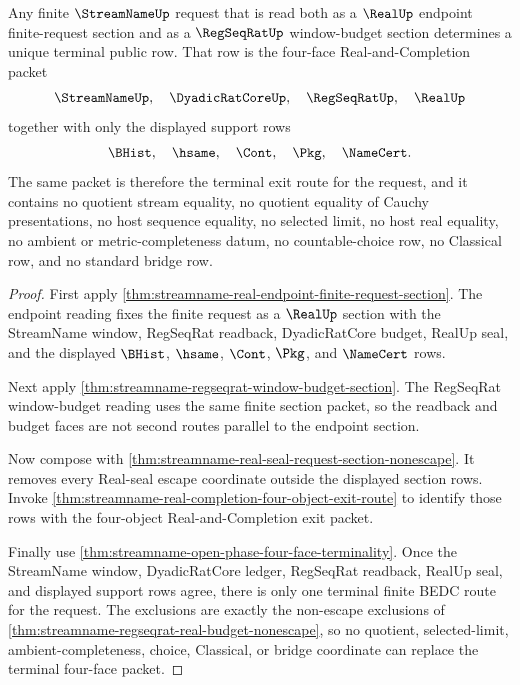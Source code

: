 \begin{theorem}
\label{thm:streamname-finite-request-terminal-coherence}
Any finite $\StreamNameUp$ request that is read both as a $\RealUp$ endpoint
finite-request section and as a $\RegSeqRatUp$ window-budget section
determines a unique terminal public row. That row is the four-face
Real-and-Completion packet
$$
\StreamNameUp,\quad \DyadicRatCoreUp,\quad \RegSeqRatUp,\quad \RealUp
$$
together with only the displayed support rows
$$
\BHist,\quad \hsame,\quad \Cont,\quad \Pkg,\quad \NameCert.
$$
The same packet is therefore the terminal exit route for the request, and it
contains no quotient stream equality, no quotient equality of Cauchy
presentations, no host sequence equality, no selected limit, no host real
equality, no ambient or metric-completeness datum, no countable-choice row, no
Classical row, and no standard bridge row.
\end{theorem}
\begin{proof}
First apply
\autoref{thm:streamname-real-endpoint-finite-request-section}. The endpoint
reading fixes the finite request as a $\RealUp$ section with the StreamName
window, RegSeqRat readback, DyadicRatCore budget, RealUp seal, and the
displayed $\BHist$, $\hsame$, $\Cont$, $\Pkg$, and $\NameCert$ rows.

Next apply \autoref{thm:streamname-regseqrat-window-budget-section}. The
RegSeqRat window-budget reading uses the same finite section packet, so the
readback and budget faces are not second routes parallel to the endpoint
section.

Now compose with
\autoref{thm:streamname-real-seal-request-section-nonescape}. It removes every
Real-seal escape coordinate outside the displayed section rows. Invoke
\autoref{thm:streamname-real-completion-four-object-exit-route} to identify
those rows with the four-object Real-and-Completion exit packet.

Finally use \autoref{thm:streamname-open-phase-four-face-terminality}. Once
the StreamName window, DyadicRatCore ledger, RegSeqRat readback, RealUp seal,
and displayed support rows agree, there is only one terminal finite BEDC route
for the request. The exclusions are exactly the non-escape exclusions of
\autoref{thm:streamname-regseqrat-real-budget-nonescape}, so no quotient,
selected-limit, ambient-completeness, choice, Classical, or bridge coordinate
can replace the terminal four-face packet.
\end{proof}

